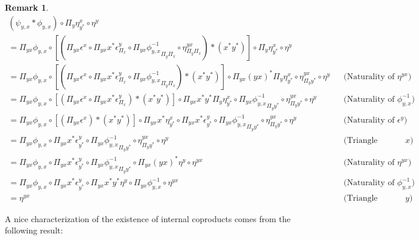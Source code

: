 \documentclass[10pt, oneside]{article}
\newtheorem{remark}[theorem]{Remark}
\begin{document}
\begin{remark}
    \begin{align*}
(\psi_{y, x} \ast \phi_{y, x}) \circ \Pi_y \eta^x_{y^\ast} \circ \eta^y \\ = \Pi_{yx} \phi_{y, x} \circ [(\Pi_{yx} \epsilon^x \circ \Pi_{yx} x^\ast \epsilon^y_{\Pi_x} \circ \Pi_{yx} {\phi^{-1}_{y, x}}_{\Pi_y \Pi_x} \circ \eta^{yx}_{\Pi_y \Pi_x}) \ast (x^\ast y^\ast)] \circ \Pi_y \eta^x_{y^\ast} \circ \eta^y \\
= \Pi_{yx} \phi_{y, x} \circ [(\Pi_{yx} \epsilon^x \circ \Pi_{yx} x^\ast \epsilon^y_{\Pi_x} \circ \Pi_{yx} {\phi^{-1}_{y, x}}_{\Pi_y \Pi_x}) \ast (x^\ast y^\ast)] \circ \Pi_{yx} {(yx)}^\ast \Pi_y \eta^x_{y^\ast} \circ \eta^{yx}_{\Pi_y y^\ast} \circ \eta^y && \text{(Naturality of $\eta^{yx}$)}
\\
= \Pi_{yx} \phi_{y, x} \circ [(\Pi_{yx} \epsilon^x \circ \Pi_{yx} x^\ast \epsilon^y_{\Pi_x}) \ast (x^\ast y^\ast)] \circ \Pi_{yx} x^\ast y^\ast \Pi_y \eta^x_{y^\ast} \circ \Pi_{yx} {\phi^{-1}_{y, x}}_{\Pi_y y^\ast} \circ \eta^{yx}_{\Pi_y y^\ast} \circ \eta^y && \text{(Naturality of $\phi_{y, x}^{-1}$)}
\\
= \Pi_{yx} \phi_{y, x} \circ [(\Pi_{yx} \epsilon^x) \ast (x^\ast y^\ast)] \circ  \Pi_{yx} x^\ast \eta^x_{y^\ast} \circ \Pi_{yx} x^\ast  \epsilon^y_{y^\ast} \circ \Pi_{yx} {\phi^{-1}_{y, x}}_{\Pi_y y^\ast} \circ \eta^{yx}_{\Pi_y y^\ast} \circ \eta^y && \text{(Naturality of $\epsilon^y$)}
\\
= \Pi_{yx} \phi_{y, x} \circ \Pi_{yx} x^\ast  \epsilon^y_{y^\ast} \circ \Pi_{yx} {\phi^{-1}_{y, x}}_{\Pi_y y^\ast} \circ \eta^{yx}_{\Pi_y y^\ast} \circ \eta^y && \text{(Triangle identity for $x$)}
\\
= \Pi_{yx} \phi_{y, x} \circ \Pi_{yx} x^\ast  \epsilon^y_{y^\ast} \circ \Pi_{yx} {\phi^{-1}_{y, x}}_{\Pi_y y^\ast} \circ \Pi_{yx} {(yx)}^\ast \eta^y \circ \eta^{yx} && \text{(Naturality of $\eta^{yx}$)}
\\
= \Pi_{yx} \phi_{y, x} \circ \Pi_{yx} x^\ast  \epsilon^y_{y^\ast} \circ \Pi_{yx} x^\ast y^\ast \eta^y \circ \Pi_{yx} {\phi^{-1}_{y, x}}\circ  \eta^{yx} && \text{(Naturality of $\phi_{y, x}^{-1}$)}
\\
= \eta^{yx} && \text{(Triangle identity for $y$)}
\end{align*}
\end{remark}

A nice characterization of the existence of internal coproducts comes from the following result:
\end{document}
